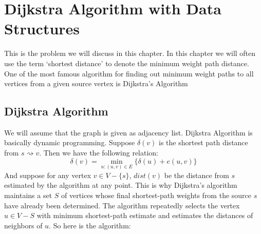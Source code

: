 \chapter{Dijkstra Algorithm with Data Structures}
\begin{algoprob}
\end{algoprob}

This is the problem we will discuss in this chapter. In this chapter we will often use the term `shortest distance' to denote the minimum weight path distance. One of the most famous algorithm for finding out minimum weight paths to all vertices from a given source vertex is Dijkstra's Algorithm
\section{Dijkstra Algorithm}
We will assume that the graph is given as adjacency list. Dijkstra Algorithm is basically dynamic programming. Suppose $\delta(v)$ is the shortest path distance from $s\rightsquigarrow v$.  Then we have the following relation:
$$\delta(v)=\min\limits_{u:(u,v)\in E}\{\delta(u)+e(u,v)\}$$And suppose for any vertex $v\in V-\{s\}$, $dist(v)$ be the distance from $s$ estimated by the algorithm at any point. This is why  Dijkstra's algorithm maintains a set $S$  of vertices   whose final shortest-path weights from the source $s$ have already been determined. The algorithm repeatedly selects the vertex $u\in V-S$ with minimum shortest-path estimate and estimates the distances of neighbors of $u$. So here is the algorithm:

\begin{algorithm}
	\DontPrintSemicolon
	\caption{$(G,s,W)$}
\end{algorithm}

